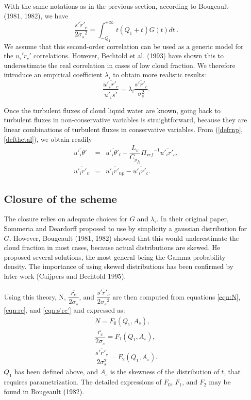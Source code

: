 With the same notations as in the previous section, according to
Bougeault (1981, 1982), we have
\begin{equation}\label{eqn:s'rc'}
\dfrac{\overline{{s'}{r'_{c}}}}{2{{\sigma}_{s}}^2} =
\int_{-Q_{1}}^{+\infty} t(Q_{1}+t)G(t) dt~.
\end{equation}
We assume that this second-order correlation can be used as a generic model
for the $\overline{u_i' r_c'}$ correlations. However, Bechtold et al. (1993)
have shown this to underestimate the real correlation in cases of low cloud
fraction. We therefore introduce an empirical coefficient $\lambda_i$ to
obtain more realistic results:
\begin{equation}\label{eqn:key}
\dfrac{\overline{u'_i r'_c}}{\overline{u'_i s'}} =
\lambda_i \dfrac{\overline{s' r'_c}}{\sigma_s^2}.
\end{equation}

\smallskip
Once the turbulent fluxes of cloud liquid water are known,
 going back to turbulent
fluxes in non-conservative variables is straightforward, because they are
linear combinations of turbulent fluxes in conservative variables.  From
(\ref{defrnp}, \ref{defthetal}), we obtain readily
\begin{eqnarray}
\overline{{u'_{i}}{{\theta}'}} &=&\overline{{u'_{i}}{{\theta}'_{l}}}  +
\dfrac{L_{v}}{{C_{p}}_{h}}{{\Pi}_{ref}}^{-1} \overline{{u'_{i}}{r'_{c}}}, \\
\overline{{u'_{i}}{r'_{v}}}&=&\overline{{u'_{i}}{r'_{np}}}  -
\overline{{u'_{i}}{r'_{c}}}.
\end{eqnarray}

\subsection{Closure of the scheme}

The closure relies on adequate choices for $G$ and $\lambda_i$.
In their original paper, Sommeria and Deardorff proposed to use by simplicity
a gaussian distribution for $G$. However, Bougeault (1981, 1982) showed
that this would underestimate the cloud fraction in most cases, because
actual distributions are skewed. He proposed several solutions, the
most general being the Gamma probability density. The importance of using
skewed distributions has been confirmed by later work (Cuijpers and
Bechtold 1995).


Using this theory, N, $\dfrac{\overline{r_{c}}}{2{\sigma}_{s}}$, and
$\dfrac{\overline{{s'}{r'_{c}}}}{2{{\sigma}_{s}}^2}$ are then computed from
equations \ref{eqn:N}, \ref{eqn:rc}, and \ref{eqn:s'rc'} and expressed as:
\begin{eqnarray}
\label{eqn:NF0} N = F_0(Q_1,A_s), \\
\label{eqn:rcF1} \dfrac{\overline{r_c}}{2\sigma_s}=F_1(Q_1,A_s),\\
\label{eqn:s'rc'F2} \dfrac{\overline{s'r'_c}}{2\sigma_s^2}=F_2(Q_1,A_s).
\end{eqnarray}
$Q_1$ has been defined above, and $A_s$ is the skewness of the distribution
of $t$, that requires parametrization.
The detailed expressions of $F_0$, $F_1$, and $F_2$ may be found in Bougeault
(1982).

